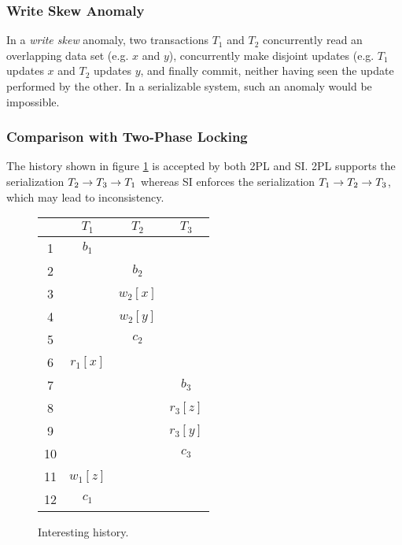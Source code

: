 \subsubsection{Write Skew Anomaly}

In a \emph{write skew} anomaly, two transactions $T_1$ and $T_2$ concurrently read an overlapping data set (e.g. $x$ and $y$), concurrently make disjoint updates (e.g. $T_1$ updates $x$ and $T_2$ updates $y$, and finally commit, neither having seen the update performed by the other. In a serializable system, such an anomaly would be impossible.


\subsubsection{Comparison with Two-Phase Locking}

The history shown in figure \ref{fig_interesting} is accepted by both 2PL and SI. 2PL supports the serialization $T_2 \rightarrow T_3 \rightarrow T_1$ whereas SI enforces the serialization $T_1 \rightarrow T_2 \rightarrow T_3$, which may lead to inconsistency.

\begin{figure}[htbp]
\begin{center}
\begin{tabular}{|c|c|c|c|}\hline
   & $T_1$    & $T_2$    & $T_3$    \\\hline\hline
1  & $b_1$    &          &          \\
2  &          & $b_2$    &          \\
3  &          & $w_2[x]$ &          \\
4  &          & $w_2[y]$ &          \\
5  &          & $c_2$    &          \\
6  & $r_1[x]$ &          &          \\
7  &          &          & $b_3$    \\
8  &          &          & $r_3[z]$ \\
9  &          &          & $r_3[y]$ \\
10 &          &          & $c_3$    \\
11 & $w_1[z]$ &          &          \\
12 & $c_1$    &          &          \\\hline
\end{tabular}
\end{center}
\caption[Interesting History]{Interesting history.}
\label{fig_interesting}
\end{figure}


